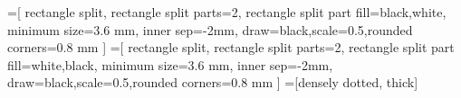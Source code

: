 =[
      rectangle split,
      rectangle split parts=2,
      rectangle split part fill={black,white},
      minimum size=3.6 mm, inner sep=-2mm, draw=black,scale=0.5,rounded corners=0.8 mm
]
=[
      rectangle split,
      rectangle split parts=2,
      rectangle split part fill={white,black},
      minimum size=3.6 mm, inner sep=-2mm, draw=black,scale=0.5,rounded corners=0.8 mm
]
=[densely dotted, thick]